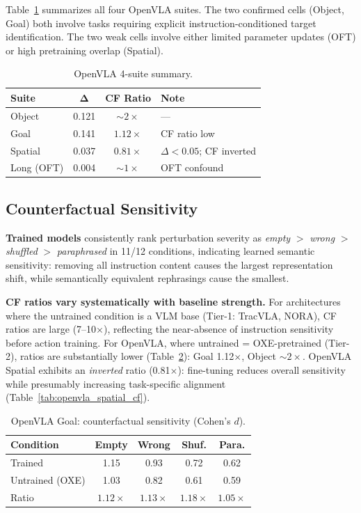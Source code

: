 \documentclass[10pt,twocolumn]{article}
\begin{document}
Table~\ref{tab:openvla_4suite} summarizes all four OpenVLA suites. The two confirmed cells (Object, Goal) both involve tasks requiring explicit instruction-conditioned target identification. The two weak cells involve either limited parameter updates (OFT) or high pretraining overlap (Spatial).

\begin{table}[t]
\centering
\caption{OpenVLA 4-suite summary.}
\label{tab:openvla_4suite}
\small
\begin{tabular}{@{}lccl@{}}
\toprule
\textbf{Suite} & $\boldsymbol{\Delta}$ & \textbf{CF Ratio} & \textbf{Note} \\
\midrule
Object & 0.121 & ${\sim}2\times$ & --- \\
Goal & 0.141 & $1.12\times$ & CF ratio low \\
Spatial & 0.037 & $0.81\times$ & $\Delta < 0.05$; CF inverted \\
Long (OFT) & 0.004 & ${\sim}1\times$ & OFT confound \\
\bottomrule
\end{tabular}
\end{table}

\subsection{Counterfactual Sensitivity}
\label{sec:cf}

\textbf{Trained models} consistently rank perturbation severity as \emph{empty} $>$ \emph{wrong} $>$ \emph{shuffled} $>$ \emph{paraphrased} in 11/12 conditions, indicating learned semantic sensitivity: removing all instruction content causes the largest representation shift, while semantically equivalent rephrasings cause the smallest.

\textbf{CF ratios vary systematically with baseline strength.}
For architectures where the untrained condition is a VLM base (Tier-1: TracVLA, NORA), CF ratios are large (7--10$\times$), reflecting the near-absence of instruction sensitivity before action training.
For OpenVLA, where untrained = OXE-pretrained (Tier-2), ratios are substantially lower (Table~\ref{tab:openvla_goal_cf}): Goal 1.12$\times$, Object ${\sim}2\times$.
OpenVLA Spatial exhibits an \emph{inverted} ratio (0.81$\times$): fine-tuning reduces overall sensitivity while presumably increasing task-specific alignment (Table~\ref{tab:openvla_spatial_cf}).

\begin{table}[t]
\centering
\caption{OpenVLA Goal: counterfactual sensitivity (Cohen's $d$).}
\label{tab:openvla_goal_cf}
\small
\begin{tabular}{@{}lcccc@{}}
\toprule
\textbf{Condition} & \textbf{Empty} & \textbf{Wrong} & \textbf{Shuf.} & \textbf{Para.} \\
\midrule
Trained & 1.15 & 0.93 & 0.72 & 0.62 \\
Untrained (OXE) & 1.03 & 0.82 & 0.61 & 0.59 \\
Ratio & $1.12\times$ & $1.13\times$ & $1.18\times$ & $1.05\times$ \\
\bottomrule
\end{tabular}
\end{table}
\end{document}
